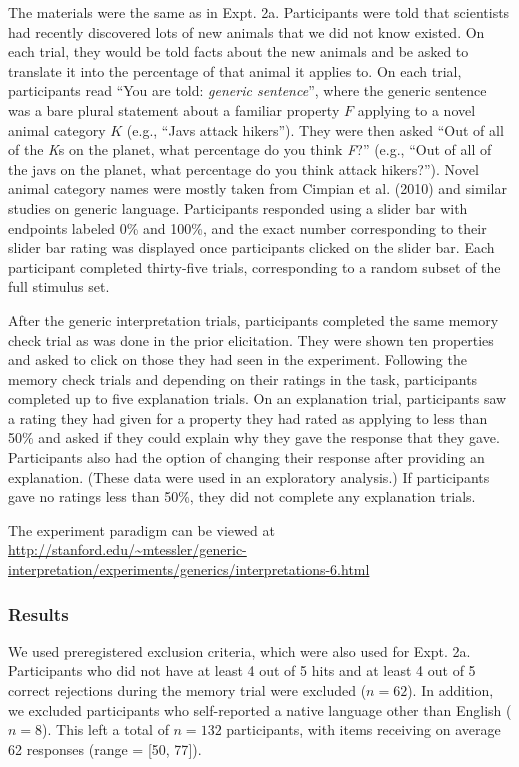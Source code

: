 \documentclass[floatsintext,doc]{apa6}
\theoremstyle{definition}
\theoremstyle{definition}
\theoremstyle{definition}
\theoremstyle{remark}
\begin{document}
The materials were the same as in Expt. 2a. Participants were told that
scientists had recently discovered lots of new animals that we did not
know existed. On each trial, they would be told facts about the new
animals and be asked to translate it into the percentage of that animal
it applies to. On each trial, participants read \enquote{You are told:
\emph{generic sentence}}, where the generic sentence was a bare plural
statement about a familiar property \(F\) applying to a novel animal
category \(K\) (e.g., \enquote{Javs attack hikers}). They were then
asked \enquote{Out of all of the \emph{K}s on the planet, what
percentage do you think \emph{F}?} (e.g., \enquote{Out of all of the
javs on the planet, what percentage do you think attack hikers?}). Novel
animal category names were mostly taken from Cimpian et al. (2010) and
similar studies on generic language. Participants responded using a
slider bar with endpoints labeled 0\% and 100\%, and the exact number
corresponding to their slider bar rating was displayed once participants
clicked on the slider bar. Each participant completed thirty-five
trials, corresponding to a random subset of the full stimulus set.

After the generic interpretation trials, participants completed the same
memory check trial as was done in the prior elicitation. They were shown
ten properties and asked to click on those they had seen in the
experiment. Following the memory check trials and depending on their
ratings in the task, participants completed up to five explanation
trials. On an explanation trial, participants saw a rating they had
given for a property they had rated as applying to less than 50\% and
asked if they could explain why they gave the response that they gave.
Participants also had the option of changing their response after
providing an explanation. (These data were used in an exploratory
analysis.) If participants gave no ratings less than 50\%, they did not
complete any explanation trials.

The experiment paradigm can be viewed at
\url{http://stanford.edu/~mtessler/generic-interpretation/experiments/generics/interpretations-6.html}

\subsubsection{Results}\label{results-2}

We used preregistered exclusion criteria, which were also used for Expt.
2a. Participants who did not have at least 4 out of 5 hits and at least
4 out of 5 correct rejections during the memory trial were excluded
(\(n = 62\)). In addition, we excluded participants who self-reported a
native language other than English (\(n = 8\)). This left a total of
\(n = 132\) participants, with items receiving on average 62 responses
(range = {[}50, 77{]}).
\end{document}

